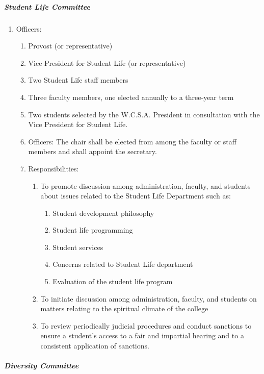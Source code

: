 \documentclass[letterpaper, 11pt]{article}
\begin{document}
				\subparagraph{Student Life Committee}
					\begin{enumerate}[label=\alph*)]
						\item{Officers:
							\begin{enumerate}[label=\arabic*)]
								\item{Provost (or representative)}
								\item{Vice President for Student Life (or representative)}
								\item{Two Student Life staff members}
								\item{Three faculty members, one elected annually to a three-year term}
								\item{Two students selected by the W.C.S.A. President in consultation with the Vice President for Student Life.}
								\item{Officers:}
								The chair shall be elected from among the faculty or staff members and shall appoint the secretary.
								\item{Responsibilities:
									\begin{enumerate}[label=\arabic*)]
										\item{To promote discussion among administration, faculty, and students about issues related to the Student Life Department such as:
											\begin{enumerate}[label=(\alph*)]
												\item{Student development philosophy}
												\item{Student life programming}
												\item{Student services}
												\item{Concerns related to Student Life department}
												\item{Evaluation of the student life program}
											\end{enumerate}
										}
										\item{To initiate discussion among administration, faculty, and students on matters relating to the spiritual climate of the college}
										\item{To review periodically judicial procedures and conduct sanctions to ensure a student's access to a fair and impartial hearing and to a consistent application of sanctions.}
									\end{enumerate}
								}
							\end{enumerate}
						}
					\end{enumerate}
				\subparagraph{Diversity Committee}
\end{document}
